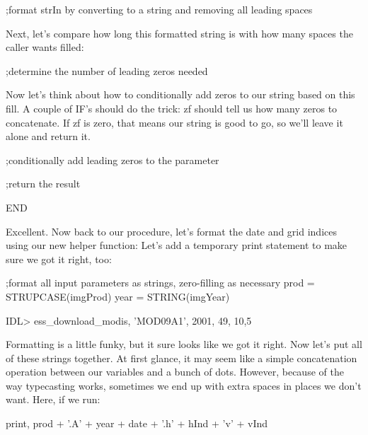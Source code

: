 \documentclass{book}
\newcounter{highlight}[page]
\newcommand{\tikzhighlightanchor}[1]{\ensuremath{\vcenter{\hbox{\tikz[remember picture, overlay]{\coordinate (#1 highlight \arabic{highlight});}}}}}
\newcommand{\bh}[0]{\stepcounter{highlight}\tikzhighlightanchor{begin}}
\newcommand{\eh}[0]{\tikzhighlightanchor{end}}
\theoremstyle{aside_style}
\begin{document}
\begin{idl}
;format strIn by converting to a string and removing all leading spaces
\end{idl}

Next, let's compare how long this formatted string is with how many spaces the caller wants filled:

\begin{idl}
;determine the number of leading zeros needed
\end{idl}

Now let's think about how to conditionally add zeros to our string based on this fill.
A couple of IF's should do the trick: zf should tell us how many zeros to concatenate.
If zf is zero, that means our string is good to go, so we'll leave it alone and return it.

\begin{idl}
;conditionally add leading zeros to the parameter

;return the result

END
\end{idl}

Excellent. Now back to our procedure, let's format the date and grid indices using our new helper function:
Let's add a temporary print statement to make sure we got it right, too:

\begin{idl}
;format all input parameters as strings, zero-filling as necessary
prod = STRUPCASE(imgProd)
year = STRING(imgYear)


IDL> ess_download_modis, 'MOD09A1', 2001, 49, 10,5
\end{idl}

Formatting is a little funky, but it sure looks like we got it right. Now let's put all of these strings together. At first glance, it may seem like a simple concatenation operation between our variables and a bunch of dots.
However, because of the way typecasting works, sometimes we end up with extra spaces in places we don't want. Here, if we run:

\begin{idl}
print, prod + '.A' + year + date + '.h' + hInd + 'v' + vInd
\end{idl}
\end{document}
